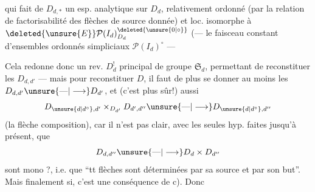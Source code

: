 qui fait de $D_{d,*}$ un esp. analytique sur $D_d$,  relativement ordonné (par la relation de factorisabilité
\diagram{\begin{tikzcd}[ampersand replacement=\&, column sep=small,row sep=small]
{} \& {} \arrow[dd,dotted] \\
\bullet \arrow[ru] \arrow[rd] \& \\
{} \& {}
\end{tikzcd}}
des flèches de source donnée)  et loc. isomorphe à $\deleted{\unsure{E}}\mathcal P(I_d)^{\deleted{\unsure{0|\circ}}}_{D_d}$  (--- le faisceau constant d'ensembles ordonnés simpliciaux $\mathcal P(I_d)^\circ$ ---

Cela redonne donc un rev. $D^!_d$ principal de groupe $\mathfrak S_d$, permettant de reconstituer les $D_{d,d'}$ --- mais pour reconstituer $D$, il faut de plus se donner  au moins les $D_{d,d'}\unsure{\text{---}|\longrightarrow}D_{d'}$, et (c'est plus sûr!) aussi
\[
D_{\unsure{d|d^\circ},d'}\mathbin{\times}_{D_{d'}}D_{d',d''}\unsure{\text{---}|\longrightarrow}D_{\unsure{d|d^\circ},d''}
\]
(la flèche composition), car il n'est pas clair, avec les seules hyp. faites jusqu'à présent, que  
\[
D_{d,d''}\unsure{\text{---}|\longrightarrow}D_d\times D_{d''}
\]
sont mono ?, i.e. que ``tt flèches sont déterminées par sa source et par son but''. Mais finalement si, c'est une conséquence de c). Donc
